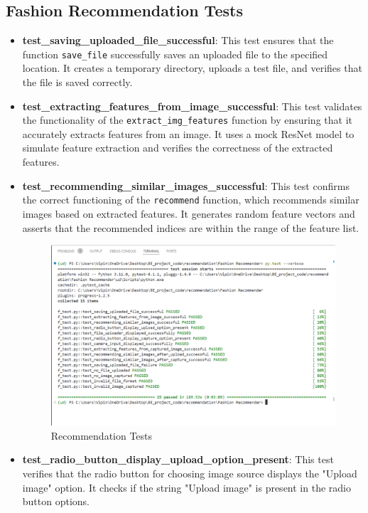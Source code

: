     \subsection{Fashion Recommendation Tests}
\begin{itemize}
    \item \textbf{test\_saving\_uploaded\_file\_successful}: This test ensures that the function \texttt{save\_file} successfully saves an uploaded file to the specified location. It creates a temporary directory, uploads a test file, and verifies that the file is saved correctly.


    \item \textbf{test\_extracting\_features\_from\_image\_successful}: This test validates the functionality of the \texttt{extract\_img\_features} function by ensuring that it accurately extracts features from an image. It uses a mock ResNet model to simulate feature extraction and verifies the correctness of the extracted features.

    \item \textbf{test\_recommending\_similar\_images\_successful}: This test confirms the correct functioning of the \texttt{recommend} function, which recommends similar images based on extracted features. It generates random feature vectors and asserts that the recommended indices are within the range of the feature list.
    
    \begin{figure}
        \includegraphics[width=\textwidth]{components/images/recomm_tests.png}
        \caption{Recommendation Tests}
        \label{fig:test-case-recomm}
    \end{figure}
    
    \item \textbf{test\_radio\_button\_display\_upload\_option\_present}: This test verifies that the radio button for choosing image source displays the "Upload image" option. It checks if the string "Upload image" is present in the radio button options.
    

\end{itemize}

